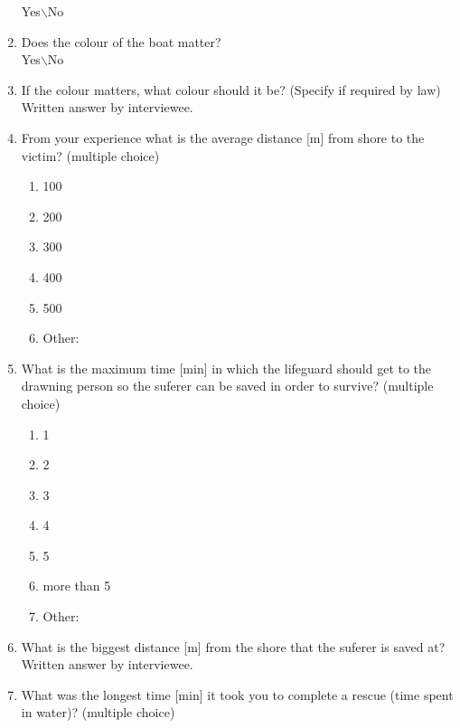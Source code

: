 \documentclass{article}[10pt]
\begin{document}
\begin{enumerate}
            Yes$\backslash$No
    \item Does the colour of the boat matter?\\
            Yes$\backslash$No
    \item If the colour matters, what colour should it be? (Specify if required by law)\\
            Written answer by interviewee.
            \newpage
    \item From your experience what is the average distance [m] from shore to the victim? (multiple choice) 
    \begin{enumerate}    
        \item  100\\
        \item  200\\
        \item  300\\
        \item  400\\
        \item  500\\
        \item  Other:
        \end{enumerate}
    \item What is the maximum time [min] in which the lifeguard should get to the drawning person so the suferer can be saved in order to survive? (multiple choice)
    \begin{enumerate}        
        \item   1\\
        \item   2\\
        \item   3\\
        \item   4\\
        \item   5\\
        \item   more than 5\\
        \item   Other:
    \end{enumerate}
    \item What is the biggest distance [m] from the shore that the suferer is saved at?\\
            Written answer by interviewee.
    \item What was the longest time [min] it took you to complete a rescue (time spent in water)? (multiple choice)

\end{enumerate}
\end{document}
